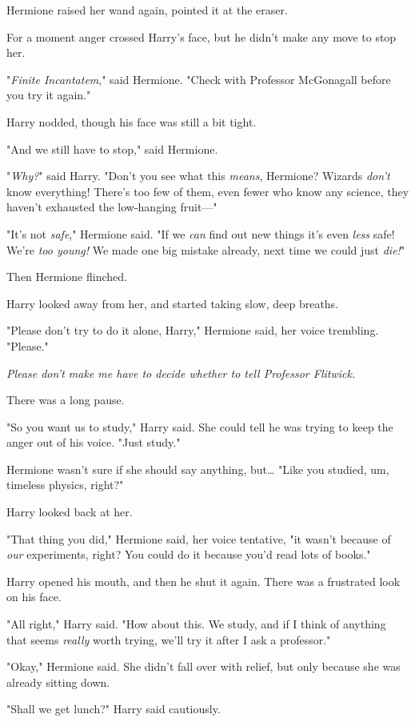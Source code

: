 Hermione raised her wand again, pointed it at the eraser.

For a moment anger crossed Harry's face, but he didn't make any move to stop
her.

"\emph{Finite Incantatem}," said Hermione. "Check with Professor McGonagall
before you try it again."

Harry nodded, though his face was still a bit tight.

"And we still have to stop," said Hermione.

"\emph{Why?}" said Harry. "Don't you see what this \emph{means}, Hermione?
Wizards \emph{don't} know everything! There's too few of them, even fewer who
know any science, they haven't exhausted the low-hanging fruit---"

"It's not \emph{safe}," Hermione said. "If we \emph{can} find out new things
it's even \emph{less} safe! We're \emph{too young!} We made one big mistake
already, next time we could just \emph{die!}"

Then Hermione flinched.

Harry looked away from her, and started taking slow, deep breaths.

"Please don't try to do it alone, Harry," Hermione said, her voice trembling.
"Please."

\emph{Please don't make me have to decide whether to tell Professor Flitwick.}

There was a long pause.

"So you want us to study," Harry said. She could tell he was trying to keep the
anger out of his voice. "Just study."

Hermione wasn't sure if she should say anything, but{\ldots} "Like you studied,
um, timeless physics, right?"

Harry looked back at her.

"That thing you did," Hermione said, her voice tentative, "it wasn't because of
\emph{our} experiments, right? You could do it because you'd read lots of
books."

Harry opened his mouth, and then he shut it again. There was a frustrated look
on his face.

"All right," Harry said. "How about this. We study, and if I think of anything
that seems \emph{really} worth trying, we'll try it after I ask a professor."

"Okay," Hermione said. She didn't fall over with relief, but only because she
was already sitting down.

"Shall we get lunch?" Harry said cautiously.

